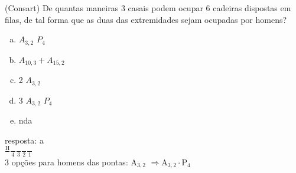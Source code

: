 \begin{ex}
 	(Consart) De quantas maneiras 3 casais podem ocupar 6 cadeiras dispostas em filas, de tal forma que as duas das extremidades sejam ocupadas por homens?
    \begin{enumerate}[(a)]
    \item $A_{3,2}$   $P_4$
    \item $A_{10,3} + A_{15,2}$
    \item 2  $A_{3,2}$
    \item 3  $A_{3,2}$  $P_4$
    \item nda
    \end{enumerate}
      \begin{sol}
       resposta: a \\
      $\frac{\mathrm{H}}{\phantom{1}}\frac{\phantom{A}}{4}\frac{\phantom{A}}{3}\frac{\phantom{A}}{2}\frac{\phantom{A}}{1}$ \\
      3 opções para homens das pontas: $\mathrm{A}_{3,2}$ \hspace{0,1cm}
      $\Longrightarrow \mathrm{A}_{3,2}\cdot \mathrm{P}_4$
      \end{sol}
\end{ex}